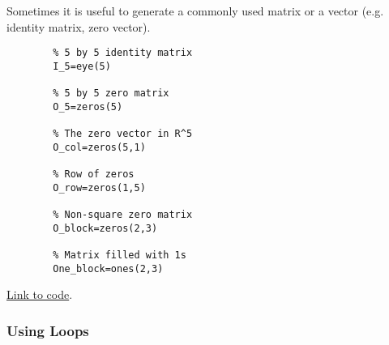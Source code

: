 \documentclass{ximera}
\begin{document}
    \begin{template}\label{temp:id_matrix}
    Sometimes it is useful to generate a commonly used matrix or a vector (e.g. identity matrix, zero vector). 
    
    \begin{verbatim}
        % 5 by 5 identity matrix
        I_5=eye(5)
        
        % 5 by 5 zero matrix
        O_5=zeros(5)
        
        % The zero vector in R^5
        O_col=zeros(5,1)
        
        % Row of zeros
        O_row=zeros(1,5)
        
        % Non-square zero matrix
        O_block=zeros(2,3)
        
        % Matrix filled with 1s
        One_block=ones(2,3)
    \end{verbatim}
    
    \href{https://sagecell.sagemath.org/?z=eJxdzT0OwjAMBeA9Uu7gpRJIYSgoIwdgAKSKGdQfV40IsUgDoZyepk06sHiwv_ecgYRqGIdq0DjlBniUzqoPZ4eb3OOAK7nmjLMsuS9aWsx5NGHRL-rS4UzeWDuyoAwUVxlkTTpZkUddkAdqp0AfjCUfTS5S44nMpn--Sov_vytN9T36rdhFf5zu0CqtsQGvXAd5KDcYA2Rw9j9PMkr_&lang=octave&interacts=eJyLjgUAARUAuQ==}{Link to code}.
    \end{template}
    
    
            
    

    \subsubsection*{Using Loops}
\end{document}
